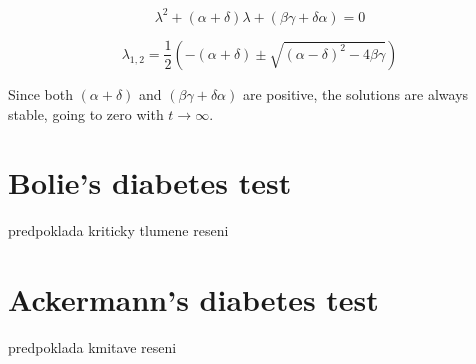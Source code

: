 \documentclass[14pt]{article}
\begin{document}
\begin{equation}
\lambda^2+(\alpha+\delta)\lambda+(\beta\gamma+\delta\alpha)=0
\end{equation}

\begin{equation}
\lambda_{1,2}=\frac{1}{2}\left(-(\alpha+\delta)\pm \sqrt{(\alpha-\delta)^2-4\beta\gamma}\right)
\end{equation}

Since both $(\alpha+\delta)$ and $(\beta\gamma+\delta\alpha)$ are positive, the solutions are always stable, going to zero with $t\rightarrow \infty$.

\section{Bolie's diabetes test}
predpoklada kriticky tlumene reseni

\section{Ackermann's diabetes test}
predpoklada kmitave reseni


%        
\end{document}
